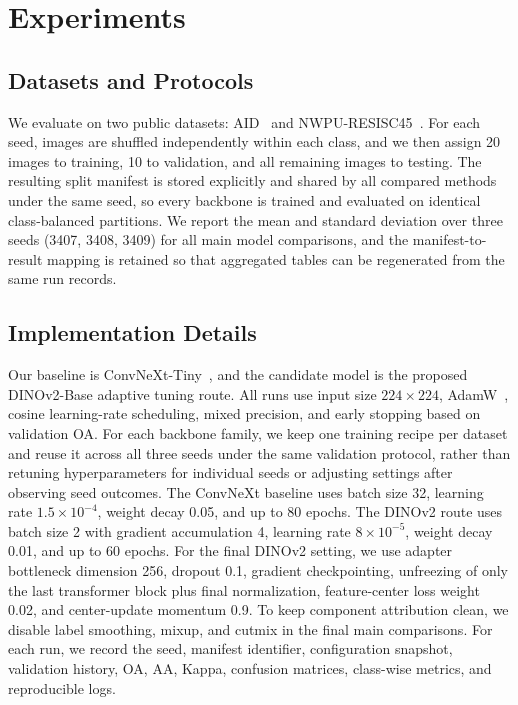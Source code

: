 \section{Experiments}
\label{sec:experiments}

\subsection{Datasets and Protocols}

We evaluate on two public datasets: AID~\cite{xia2017aid} and NWPU-RESISC45~\cite{cheng2017nwpu}. For each seed, images are shuffled independently within each class, and we then assign 20 images to training, 10 to validation, and all remaining images to testing. The resulting split manifest is stored explicitly and shared by all compared methods under the same seed, so every backbone is trained and evaluated on identical class-balanced partitions. We report the mean and standard deviation over three seeds (3407, 3408, 3409) for all main model comparisons, and the manifest-to-result mapping is retained so that aggregated tables can be regenerated from the same run records.

\subsection{Implementation Details}

Our baseline is ConvNeXt-Tiny~\cite{liu2022convnext}, and the candidate model is the proposed DINOv2-Base adaptive tuning route. All runs use input size $224 \times 224$, AdamW~\cite{loshchilov2019adamw}, cosine learning-rate scheduling, mixed precision, and early stopping based on validation OA. For each backbone family, we keep one training recipe per dataset and reuse it across all three seeds under the same validation protocol, rather than retuning hyperparameters for individual seeds or adjusting settings after observing seed outcomes. The ConvNeXt baseline uses batch size 32, learning rate $1.5\times 10^{-4}$, weight decay 0.05, and up to 80 epochs. The DINOv2 route uses batch size 2 with gradient accumulation 4, learning rate $8\times 10^{-5}$, weight decay 0.01, and up to 60 epochs. For the final DINOv2 setting, we use adapter bottleneck dimension 256, dropout 0.1, gradient checkpointing, unfreezing of only the last transformer block plus final normalization, feature-center loss weight 0.02, and center-update momentum 0.9. To keep component attribution clean, we disable label smoothing, mixup, and cutmix in the final main comparisons. For each run, we record the seed, manifest identifier, configuration snapshot, validation history, OA, AA, Kappa, confusion matrices, class-wise metrics, and reproducible logs.

